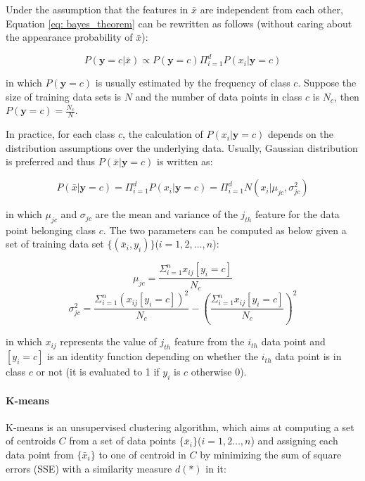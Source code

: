 Under the assumption that the features in $\bar{x}$ are independent from each other, Equation \ref{eq: bayes_theorem} can be rewritten as follows (without caring about the appearance probability of $\bar{x}$):

\begin{equation}\label{eq: nb_exp}
    P(\textbf{y}=c|\bar{x}) \propto P(\textbf{y}=c)\Pi_{i=1}^dP(x_i|\textbf{y}=c)
\end{equation}

in which $P(\textbf{y}=c)$ is usually estimated by the frequency of class $c$. Suppose the size of training data sets is $N$ and the number of data points in class $c$ is $N_c$, then $P(\textbf{y}=c) = \frac{N_c}{N}$.

In practice, for each class $c$, the calculation of $P(x_i|\textbf{y}=c)$ depends on the distribution assumptions over the underlying data. Usually, Gaussian distribution is preferred and thus $P(\bar{x}|\textbf{y}=c)$ is written as:

\begin{equation}\label{eq: nb_guassian}
    P(\bar{x}|\textbf{y}=c) = \Pi_{i=1}^dP(x_i|\textbf{y}=c) = \Pi_{i=1}^dN(x_i|\mu_{jc}, \sigma_{jc}^2)
\end{equation}

in which $\mu_{jc}$ and $\sigma_{jc}$ are the mean and variance of the $j_{th}$ feature for the data point belonging class $c$. The two parameters can be computed as below given a set of training data set $\{(\bar{x}_i, y_i)\}$($i=1,2,\dots, n$):

\begin{equation}\label{eq: nb_mean}
    \mu_{jc} = \frac{\Sigma_{i=1}^nx_{ij}[y_i=c]}{N_c}
\end{equation}
\begin{equation}\label{eq: nb_var}
    \sigma_{jc}^2 = \frac{\Sigma_{i=1}^n(x_{ij}[y_i=c])^2}{N_c}-(\frac{\Sigma_{i=1}^nx_{ij}[y_i=c]}{N_c})^2
\end{equation}

in which $x_{ij}$ represents the value of $j_{th}$ feature from the $i_{th}$ data point and $[y_i=c]$ is an identity function depending on whether the $i_{th}$ data point is in class $c$ or not (it is evaluated to 1 if $y_i$ is $c$ otherwise 0).

\paragraph{K-means} K-means is an unsupervised clustering algorithm, which aims at computing a set of centroids $C$ from a set of data points $\{\bar{x}_i\}$($i=1,2\dots,n$) and assigning each data point from $\{\bar{x}_i\}$ to one of centroid in $C$ by minimizing the sum of square errors (SSE) with a similarity measure $d(*)$ in it:

